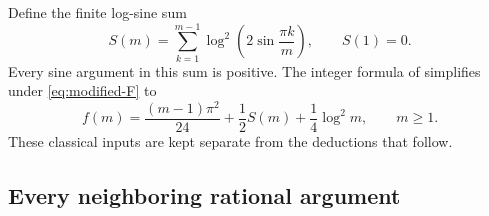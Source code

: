 Define the finite log-sine sum
\begin{equation}\label{eq:S}
 S(m)=\sum_{k=1}^{m-1}\log^2\left(2\sin\frac{\pi k}{m}\right),
 \qquad S(1)=0.
\end{equation}
Every sine argument in this sum is positive. The integer formula of
\cite[(23)]{RZ} simplifies under \eqref{eq:modified-F} to
\begin{equation}\label{eq:f-integer}
 f(m)=\frac{(m-1)\pi^2}{24}+\frac12S(m)+\frac14\log^2m,
 \qquad m\ge1.
\end{equation}
These classical inputs are kept separate from the deductions that follow.

\subsection{Every neighboring rational argument}

